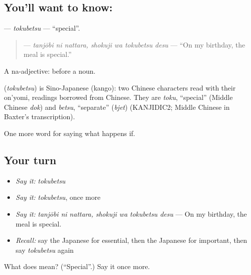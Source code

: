 \subsection*{You'll want to know: }
\textbf{} — \emph{tokubetsu} — \textquotedblleft{}special\textquotedblright{}.

\begin{quote}
\textbf{  } — \emph{tanjōbi ni nattara, shokuji wa tokubetsu desu} — \textquotedblleft{}On my birthday, the meal is special.\textquotedblright{}
\end{quote}

A na-adjective:  before a noun.

\begin{cousinweb}
\textbf{} (\emph{tokubetsu}) is Sino-Japanese (kango): two Chinese characters read with their on'yomi, readings borrowed from Chinese. They are \emph{toku}, \textquotedblleft{}special\textquotedblright{} (Middle Chinese \emph{dok}) and \emph{betsu}, \textquotedblleft{}separate\textquotedblright{} (\emph{bjet}) (KANJIDIC2; Middle Chinese in Baxter's transcription).
\end{cousinweb}

\begin{grammarlens}[title={What you've built}]
One more word for saying what happens if.
\end{grammarlens}

\subsection*{Your turn}
\begin{itemize}
\raggedright
  \item \emph{Say it:} \emph{tokubetsu}
  \item \emph{Say it:} \emph{tokubetsu}, once more
  \item \emph{Say it:} \emph{tanjōbi ni nattara, shokuji wa tokubetsu desu} — On my birthday, the meal is special.
  \item \emph{Recall:} say the Japanese for essential, then the Japanese for important, then say \emph{tokubetsu} again
\end{itemize}

\begin{tcolorbox}[breakable,colback=teal!4,colframe=teal!35!black,title={Before you move on}]
What does  mean? (\textquotedblleft{}Special\textquotedblright{}.) Say it once more.
\end{tcolorbox}
